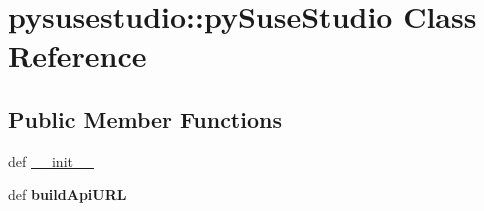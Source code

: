 \hypertarget{classpysusestudio_1_1py_suse_studio}{
\section{pysusestudio::pySuseStudio Class Reference}
\label{classpysusestudio_1_1py_suse_studio}
}
\subsection*{Public Member Functions}
\begin{DoxyCompactItemize}
\item 
def \hyperlink{classpysusestudio_1_1py_suse_studio_a8067ee791da6de5d42fa2954d6eff0ce}{\_\-\_\-init\_\-\_\-}
\item 
\hypertarget{classpysusestudio_1_1py_suse_studio_a69265b9890834789bfc75b8d8dbe1738}{
def {\bfseries buildApiURL}}
\label{classpysusestudio_1_1py_suse_studio_a69265b9890834789bfc75b8d8dbe1738}


\end{DoxyCompactItemize}
